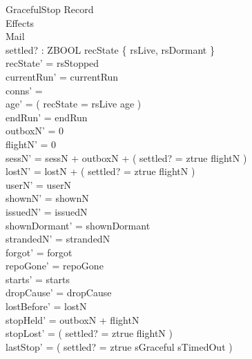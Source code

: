 \documentclass[a4paper,10pt,fleqn]{article}
\begin{document}
\begin{schema}{GracefulStop}
  \Delta Record \\
  \Xi Effects \\
  \Delta Mail \\
  settled? : ZBOOL
  \where
  recState \in \{ rsLive, rsDormant \} \\
  recState' = rsStopped \\
  currentRun' = currentRun \\
  conns' = \emptyset \\
  age' = ( \IF recState = rsLive  \ELSE age ) \\
  endRun' = endRun \\
  outboxN' = 0 \\
  flightN' = 0 \\
  sessN' = sessN + outboxN + ( \IF settled? = ztrue \THEN flightN  ) \\
  lostN' = lostN + ( \IF settled? = ztrue  \ELSE flightN ) \\
  userN' = userN \\
  shownN' = shownN \\
  issuedN' = issuedN \\
  shownDormant' = shownDormant \\
  strandedN' = strandedN \\
  forgot' = forgot \\
  repoGone' = repoGone \\
  starts' = starts \\
  dropCause' = dropCause \\
  lostBefore' = lostN \\
  stopHeld' = outboxN + flightN \\
  stopLost' = ( \IF settled? = ztrue  \ELSE flightN ) \\
  lastStop' = ( \IF settled? = ztrue \THEN sGraceful \ELSE sTimedOut )
\end{schema}
\end{document}
